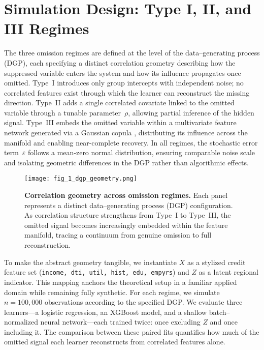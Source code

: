 \documentclass[11pt]{article}
\begin{document}
\section{Simulation Design: Type I, II, and III Regimes}
\label{sec:simulation}

The three omission regimes are defined at the level of the data–generating process (DGP), each specifying a distinct correlation geometry describing how the suppressed variable enters the system and how its influence propagates once omitted.  
Type~I introduces only group intercepts with independent noise; no correlated features exist through which the learner can reconstruct the missing direction.  
Type~II adds a single correlated covariate linked to the omitted variable through a tunable parameter~$\rho$, allowing partial inference of the hidden signal.  
Type~III embeds the omitted variable within a multivariate feature network generated via a Gaussian copula \cite{nelsen2007copulas}, distributing its influence across the manifold and enabling near-complete recovery.  
In all regimes, the stochastic error term~$\varepsilon$ follows a mean-zero normal distribution, ensuring comparable noise scale and isolating geometric differences in the DGP rather than algorithmic effects.

\begin{figure}[htpb]
  \centering
  \texttt{[image: fig\_1\_dgp\_geometry.png]}
  \caption{\textbf{Correlation geometry across omission regimes.} 
  Each panel represents a distinct data–generating process (DGP) configuration. 
  As correlation structure strengthens from Type~I to Type~III, the omitted signal becomes increasingly embedded within the feature manifold, tracing a continuum from genuine omission to full reconstruction.}
  \label{fig:dgp}
\end{figure}

To make the abstract geometry tangible, we instantiate $X$ as a stylized credit feature set 
(\texttt{income, dti, util, hist, edu, empyrs}) and $Z$ as a latent regional indicator. 
This mapping anchors the theoretical setup in a familiar applied domain while remaining fully synthetic. For each regime, we simulate $n = 100{,}000$ observations according to the specified DGP.
We evaluate three learners—a logistic regression, an XGBoost model, and a shallow batch–normalized neural network—each trained twice: once excluding $Z$ and once including it.  
The comparison between these paired fits quantifies how much of the omitted signal each learner reconstructs from correlated features alone.
\end{document}

